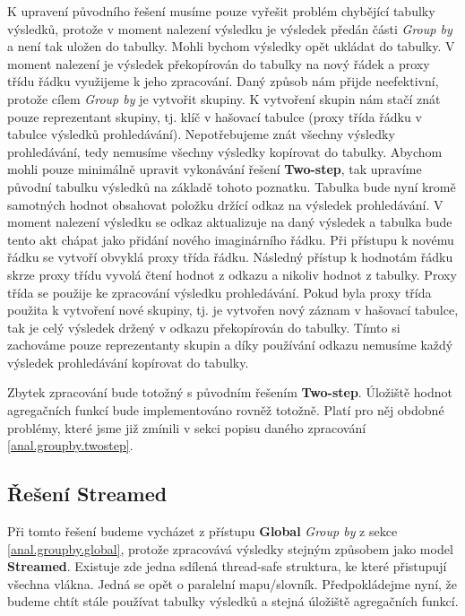 K upravení původního řešení musíme pouze vyřešit problém chybějící tabulky výsledků, protože v moment nalezení výsledku je výsledek předán části \textit{Group by} a není tak uložen do tabulky.
Mohli bychom výsledky opět ukládat do tabulky.
V moment nalezení je výsledek překopírován do tabulky na nový řádek a proxy třídu řádku využijeme k jeho zpracování.
Daný způsob nám přijde neefektivní, protože cílem \textit{Group by} je vytvořit skupiny. 
K vytvoření skupin nám stačí znát pouze reprezentant skupiny, tj. klíč v hašovací tabulce (proxy třída řádku v tabulce výsledků prohledávání).
Nepotřebujeme znát všechny výsledky prohledávání, tedy nemusíme všechny výsledky kopírovat do tabulky.
Abychom mohli pouze minimálně upravit vykonávání řešení \textbf{Two-step}, tak upravíme původní tabulku výsledků na základě tohoto poznatku.
Tabulka bude nyní kromě samotných hodnot obsahovat položku držící odkaz na výsledek prohledávání.
V moment nalezení výsledku se odkaz aktualizuje na daný výsledek a tabulka bude tento akt chápat jako přidání nového imaginárního řádku.
Při přístupu k novému řádku se vytvoří obvyklá proxy třída řádku.
Následný přístup k hodnotám řádku skrze proxy třídu vyvolá čtení hodnot z odkazu a nikoliv hodnot z tabulky.
Proxy třída se použije ke zpracování výsledku prohledávání.
Pokud byla proxy třída použita k vytvoření nové skupiny, tj. je vytvořen nový záznam v hašovací tabulce, tak je celý výsledek držený v odkazu překopírován do tabulky.
Tímto si zachováme pouze reprezentanty skupin a díky používání odkazu nemusíme každý výsledek prohledávání kopírovat do tabulky.

Zbytek zpracování bude totožný s původním řešením \textbf{Two-step}.
Úložiště hodnot agregačních funkcí bude implementováno rovněž totožně.
Platí pro něj obdobné problémy, které jsme již zmínili v sekci popisu daného zpracování \ref{anal.groupby.twostep}. 

\subsection{Řešení Streamed}

Při tomto řešení budeme vycházet z přístupu \textbf{Global} \textit{Group by} z sekce \ref{anal.groupby.global}, protože zpracovává výsledky stejným způsobem jako model \textbf{Streamed}.
Existuje zde jedna sdílená thread-safe struktura, ke které přistupují všechna vlákna.
Jedná se opět o paralelní mapu/slovník.
Předpokládejme nyní, že budeme chtít stále používat tabulky výsledků a stejná úložiště agregačních funkcí.


